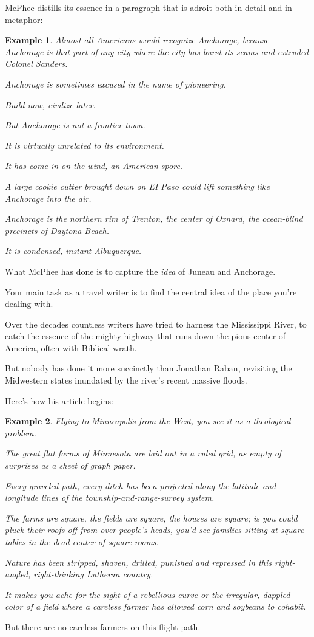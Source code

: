 \documentclass{book}
\numberwithin{equation}{section}
\newtheorem{example}{Example}[chapter]
\begin{document}
McPhee distills its essence in a paragraph that is adroit both in detail and in metaphor:
\begin{example}
    Almost all Americans would recognize Anchorage, because Anchorage is that part of any city where the city has burst its seams and extruded Colonel Sanders.
    
    Anchorage is sometimes excused in the name of pioneering.
    
    Build now, civilize later.
    
    But Anchorage is not a frontier town.
    
    It is virtually unrelated to its environment.
    
    It has come in on the wind, an American spore.
    
    A large cookie cutter brought down on EI Paso could lift something like Anchorage into the air.
    
    Anchorage is the northern rim of Trenton, the center of Oxnard, the ocean-blind precincts of Daytona Beach.
    
    It is condensed, instant Albuquerque.
\end{example}
What McPhee has done is to capture the \textit{idea} of Juneau and Anchorage.

Your main task as a travel writer is to find the central idea of the place you're dealing with.

Over the decades countless writers have tried to harness the Mississippi River, to catch the essence of the mighty highway that runs down the pious center of America, often with Biblical wrath.

But nobody has done it more succinctly than Jonathan Raban, revisiting the Midwestern states inundated by the river's recent massive floods.

Here's how his article begins:
\begin{example}
    Flying to Minneapolis from the West, you see it as a theological problem.
    
    The great flat farms of Minnesota are laid out in a ruled grid, as empty of surprises as a sheet of graph paper.
    
    Every graveled path, every ditch has been projected along the latitude and longitude lines of the township-and-range-survey system.
    
    The farms are square, the fields are square, the houses are square; is you could pluck their roofs off from over people's heads, you'd see families sitting at square tables in the dead center of square rooms.
    
    Nature has been stripped, shaven, drilled, punished and repressed in this right-angled, right-thinking Lutheran country.
    
    It makes you ache for the sight of a rebellious curve or the irregular, dappled color of a field where a careless farmer has allowed corn and soybeans to cohabit.
\end{example}
But there are no careless farmers on this flight path.
\end{document}
